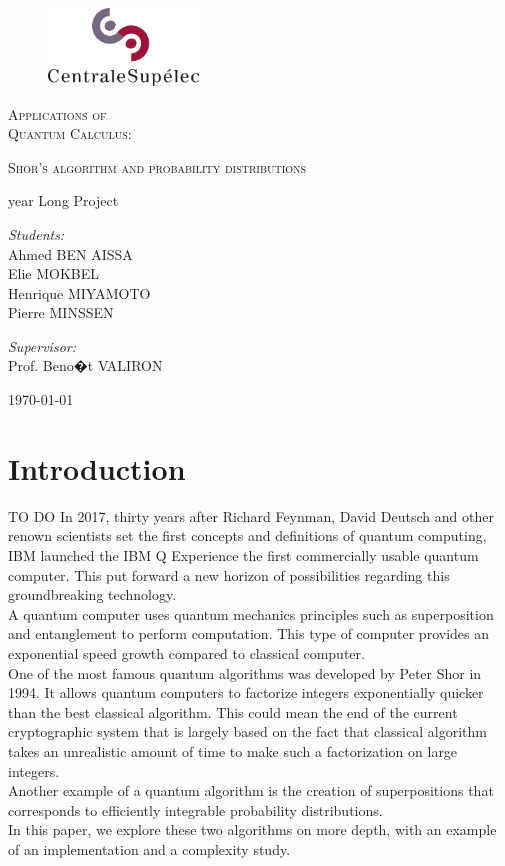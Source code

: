 \documentclass[a4paper, 10pt]{article}
\numberwithin{equation}{section}
\numberwithin{figure}{section}
\numberwithin{table}{section}
\begin{document}
\begin{titlepage}
	\centering
	\begin{figure}[h!]
		\centering
		\includegraphics[width=4cm]{Figures/cs}
	\end{figure}
	\vspace{3cm}
	{\scshape\Huge Applications of\\ Quantum Calculus:\par}
	\vspace{2mm}
	{\scshape\huge Shor's algorithm and probability distributions\par}
	\vspace{1.5cm}
	{\Large {} year Long Project\par}
	\vspace{2cm}
	{\large \textit{Students:}\\
			Ahmed BEN AISSA\\
			Elie MOKBEL\\
			Henrique MIYAMOTO\\
			Pierre MINSSEN\par}
	\vspace{1.5cm}
	{\large \textit{Supervisor:}\\
			Prof. Beno�t VALIRON \par}
	\vfill
	\large \today
\end{titlepage}

\tableofcontents

\newpage
\section{Introduction}
{\color{red} TO DO}
In 2017, thirty years after Richard Feynman, David Deutsch and other renown scientists set the first concepts and definitions of quantum computing, IBM launched the IBM Q Experience the first commercially usable quantum computer. This put forward a new horizon of possibilities regarding this groundbreaking technology.\\
A quantum computer uses quantum mechanics principles such as superposition and entanglement to perform computation. This type of computer provides an exponential speed growth compared to classical computer.\\
One of the most famous quantum algorithms was developed by Peter Shor in 1994. It allows quantum computers to factorize integers exponentially quicker than the best classical algorithm. This could mean the end of the current cryptographic system that is largely based on the fact that classical algorithm takes an unrealistic amount of time to make such a factorization on large integers.\\
Another example of a quantum algorithm is the creation of superpositions that corresponds to efficiently integrable probability distributions.\\
In this paper, we explore these two algorithms on more depth, with an example of an implementation and a complexity study.\\
\end{document}
